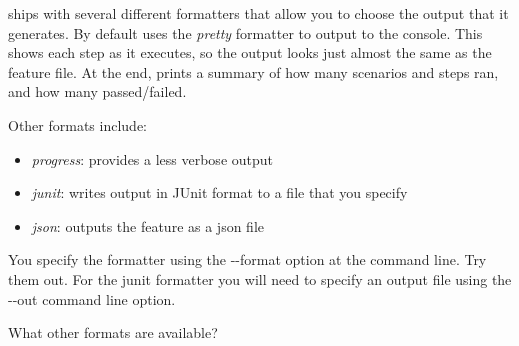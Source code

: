 \CUKE{} ships with several different formatters that allow you to choose the output that it generates. By default \CUKE{} uses the \emph{pretty} formatter to output to the console. This shows each step as it executes, so the output looks just almost the same as the feature file. At the end, \CUKE{} prints a summary of how many scenarios and steps ran, and how many passed/failed.

Other formats include: 

\begin{itemize}
    \item \emph{progress}: provides a less verbose output
    \item \emph{junit}: writes output in JUnit format to a file that you specify
    \item \emph{json}: outputs the feature as a json file
\end{itemize}

You specify the formatter using the -{}-format option at the command line. Try them out. For the junit formatter you will need to specify an output file using the -{}-out command line option.

What other formats are available?
